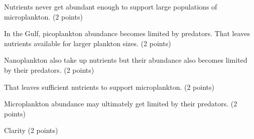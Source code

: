 \documentclass[12pt, addpoints]{exam}
\newenvironment{AnswerPage}[1]
    {\begin{minipage}[t][#1]{0.92\textwidth}%
    \begin{solution}}
    {\end{solution}\end{minipage}
    \vspace*{\stretch{1}}}
\begin{document}
\begin{questions}
\begin{AnswerPage}{0.4\textheight}
	Nutrients never get abundant enough to support large populations of microplankton. (2 points) 
	
	\vspace*{\baselineskip}
	
	In the Gulf, picoplankton abundance becomes limited by predators. That leaves nutrients available for larger plankton sizes. (2 points)
	
	\vspace*{\baselineskip}
	
	Nanoplankton also take up nutrients but their abundance also becomes limited by their predators. (2 points)
	
	\vspace*{\baselineskip}
	
	That leaves sufficient nutrients to support microplankton. (2 points)
	
	\vspace*{\baselineskip}
	
	Microplankton abundance may ultimately get limited by their predators. (2 points)
	
	\vspace*{\baselineskip}
	
	Clarity (2 points)
	
	
	
	\end{AnswerPage}

\end{questions}
\end{document}

